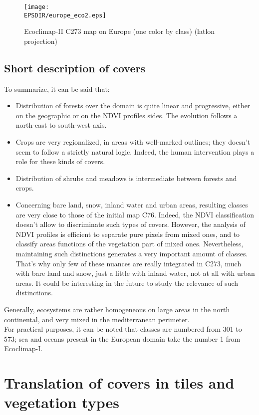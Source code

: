 \begin{figure}
\begin{center}
\texttt{[image: \\EPSDIR/europe\_eco2.eps]}
\caption{\label{figure2} Ecoclimap-II C273 map on Europe (one color by class) (latlon projection)} 
\end{center}
\end{figure}

\subsection{Short description of covers}

To summarize, it can be said that:
\begin{itemize}
\item{Distribution of forests over the domain is quite linear and progressive, either on the geographic or on the NDVI profiles sides. The evolution 
follows a north-east to south-west axis.}
\item{Crops are very regionalized, in areas with well-marked outlines; they doesn't seem to follow a strictly natural logic. Indeed, 
the human intervention plays a role for these kinds of covers.}
\item{Distribution of shrubs and meadows is intermediate between forests and crops.}
\item{Concerning bare land, snow, inland water and urban areas, resulting classes are very close to those of the initial map C76. Indeed, the NDVI 
classification doesn't allow to discriminate such types of covers. However, the analysis of NDVI profiles is efficient to separate pure 
pixels from mixed ones, and to classify areas functions of the vegetation part of mixed ones. Nevertheless, maintaining such distinctions 
generates a very important amount of classes. That's why only few of these nuances are really integrated in C273, much with bare land and 
snow, just a little with inland water, not at all with urban areas. It could be interesting in the future to study the relevance of such 
distinctions.}
\end{itemize}
Generally, ecosystems are rather homogeneous on large areas in the north continental, and very mixed in the mediterranean perimeter. \\

For practical purposes, it can be noted that classes are numbered from 301 to 573; sea and oceans present in the European domain 
take the number 1 from Ecoclimap-I. 

\section{Translation of covers in tiles and vegetation types}

